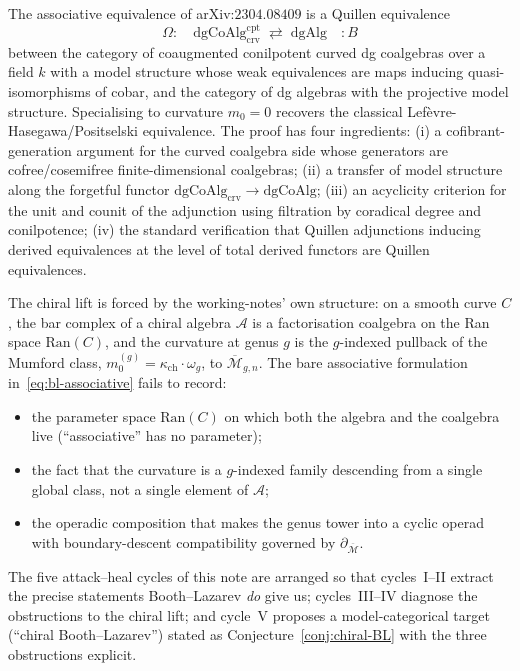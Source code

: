 \documentclass[11pt]{amsart}
\newcommand{\kch}{\kappa_{\mathrm{ch}}}
\newcommand{\cA}{\mathcal{A}}
\newcommand{\cM}{\mathcal{M}}
\newcommand{\Ran}{\mathrm{Ran}}
\newcommand{\crv}{\mathrm{crv}}
\newcommand{\cpt}{\mathrm{cpt}}
\newcommand{\dgAlg}{\mathrm{dgAlg}}
\newcommand{\dgCoAlg}{\mathrm{dgCoAlg}}
\newcommand{\Mbar}{\overline{\cM}}
\begin{document}
The associative equivalence of arXiv:$2304.08409$ is a Quillen
equivalence
\begin{equation}
\Omega:\quad \dgCoAlg^{\cpt}_{\crv} \;\rightleftarrows\; \dgAlg \quad :B
\label{eq:bl-associative}
\end{equation}
between the category of coaugmented conilpotent curved dg coalgebras
over a field $k$ with a model structure whose weak equivalences are
maps inducing quasi-isomorphisms of cobar, and the category of dg
algebras with the projective model structure. Specialising to
curvature $m_0=0$ recovers the classical
Lef\`evre-Hasegawa/Positselski equivalence. The proof has four
ingredients: (i) a cofibrant-generation argument for the curved
coalgebra side whose generators are cofree/cosemifree finite-dimensional
coalgebras; (ii) a transfer of model structure along the forgetful
functor $\dgCoAlg_{\crv}\to\dgCoAlg$; (iii) an acyclicity criterion
for the unit and counit of the adjunction using filtration by
coradical degree and conilpotence; (iv) the standard verification that
Quillen adjunctions inducing derived equivalences at the level of
total derived functors are Quillen equivalences.

The chiral lift is forced by the working-notes' own structure: on a
smooth curve $C$, the bar complex of a chiral algebra $\cA$ is a
factorisation coalgebra on the Ran space $\Ran(C)$, and the curvature
at genus $g$ is the $g$-indexed pullback of the Mumford class,
$m_0^{(g)}=\kch\cdot\omega_g$, to $\Mbar_{g,n}$. The bare associative
formulation in~\eqref{eq:bl-associative} fails to record:
\begin{itemize}
\item the parameter space $\Ran(C)$ on which both the algebra and the
coalgebra live (``associative'' has no parameter);
\item the fact that the curvature is a $g$-indexed family descending
from a single global class, not a single element of
$\cA$;
\item the operadic composition that makes the genus tower into a
cyclic operad with boundary-descent compatibility governed by
$\partial_{\Mbar}$.
\end{itemize}

The five attack--heal cycles of this note are arranged so that
cycles~I--II extract the precise statements Booth--Lazarev \emph{do}
give us; cycles~III--IV diagnose the obstructions to the chiral lift;
and cycle~V proposes a model-categorical target (``chiral
Booth--Lazarev'') stated as Conjecture~\ref{conj:chiral-BL} with the
three obstructions explicit.
\end{document}

